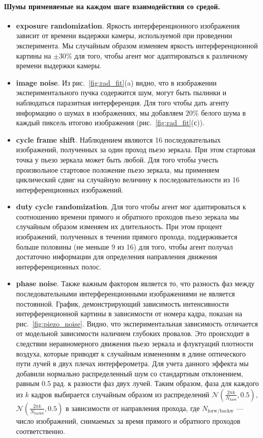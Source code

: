 \paragraph{Шумы применяемые на каждом шаге взаимодействия со средой.}
\begin{itemize}
    \item \textbf{exposure randomization}. Яркость интерференционного изображения зависит от времени выдержки камеры, используемой при проведении эксперимента. Мы случайным образом изменяем яркость интерференционной картины на $\pm 30\%$ для того, чтобы агент мог адаптироваться к различному времени выдержки камеры.
    \item  \textbf{image noise}. Из рис.~\ref{fig:rad_fit}(a) видно, что в изображении экспериментального пучка содержится шум, могут быть пылинки и наблюдаться паразитная интерференция. Для того чтобы дать агенту информацию о шумах в изображениях, мы добавляем $20\%$ белого шума в каждый пиксель итогово изображения (рис.~\ref{fig:rad_fit}(с)). 
    \item \textbf{cycle frame shift}. Наблюдением являются 16 последовательных изображений, полученных за один проход пьезо зеркала. При этом стартовая точка у пьезо зеркала может быть любой. Для того чтобы учесть произвольное стартовое положение пьезо зеркала, мы применяем циклический сдвиг на случайную величину к последовательности из 16 интерференционных изображений. 
    \item \textbf{duty cycle randomization}. Для того чтобы агент мог адаптироваться к соотношению времени прямого и обратного проходов пьезо зеркала мы случайным образом изменяем их длительность. При этом процент изображений, полученных в течении прямого прохода, поддерживается больше половины (не меньше 9 из 16) для того, чтобы агент получал достаточно информации для определения направления движения интерференционных полос.  
    \item \textbf{phase noise}. Также важным фактором является то, что разность фаз между последовательными интерференционными изображениями не является постоянной. График, демонстрирующий зависимость интенсивности интерференционной картины в зависимости от номера кадра, показан на рис.~\ref{fig:piezo_noise}. Видно, что экспериментальная зависимость отличается от модельной зависимости наличием глубоких провалов. Это происходит в следствии неравномерного движения пьезо зеркала и флуктуаций плотности воздуха, которые приводят к случайным изменениям в длине оптического пути лучей в двух плечах интерферометра. Для учета данного эффекта мы добавили нормально распределенный шум со стандартным отклонением, равным $0.5$ рад. к разности фаз двух лучей. Таким образом, фаза для каждого из $k$ кадров выбирается случайным образом из распределений $\mathcal{N}(\frac{2\pi k}{N_{\mathrm{forw}}}, 0.5)$, $\mathcal{N}(\frac{2\pi k}{N_{\mathrm{backw}}}, 0.5)$ в зависимости от направления прохода, где $N_{\mathrm{forw/backw}}$ --- число изображений, снимаемых за время прямого и обратного проходов соответственно.
\end{itemize}

